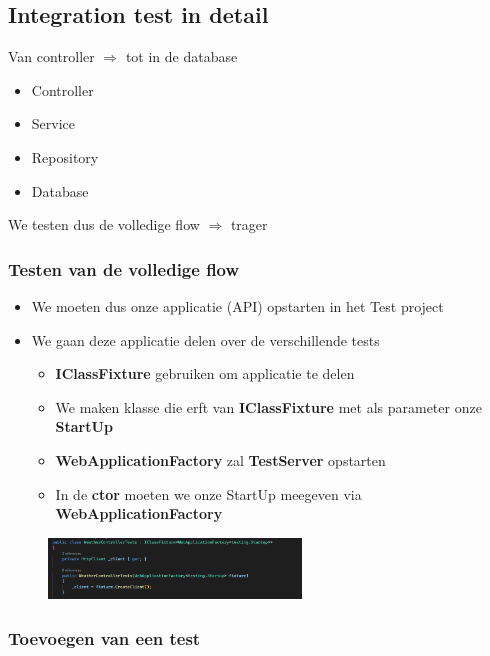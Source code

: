 \documentclass{article}
\begin{document}
\subsection{Integration test in detail}

Van controller $\Rightarrow$ tot in de database

\begin{itemize}
    \item Controller
    \item Service
    \item Repository
    \item Database
\end{itemize}

We testen dus de volledige flow $\Rightarrow$ trager

\subsubsection{Testen van de volledige flow}

\begin{itemize}
    \item We moeten dus onze applicatie (API) opstarten in het Test project
    \item We gaan deze applicatie delen over de verschillende tests
    \begin{itemize}
        \item \textbf{IClassFixture} gebruiken om applicatie te delen
        \item We maken klasse die erft van \textbf{IClassFixture} met als parameter onze \textbf{StartUp}
        \item \textbf{WebApplicationFactory} zal \textbf{TestServer} opstarten
        \item In de \textbf{ctor} moeten we onze StartUp meegeven via \textbf{WebApplicationFactory}
    \end{itemize}
\end{itemize}

\begin{figure}[H]
    \centering
    \includegraphics[width=0.6\textwidth]{integration-test1.png}
\end{figure}


\subsubsection{Toevoegen van een test}
\end{document}
